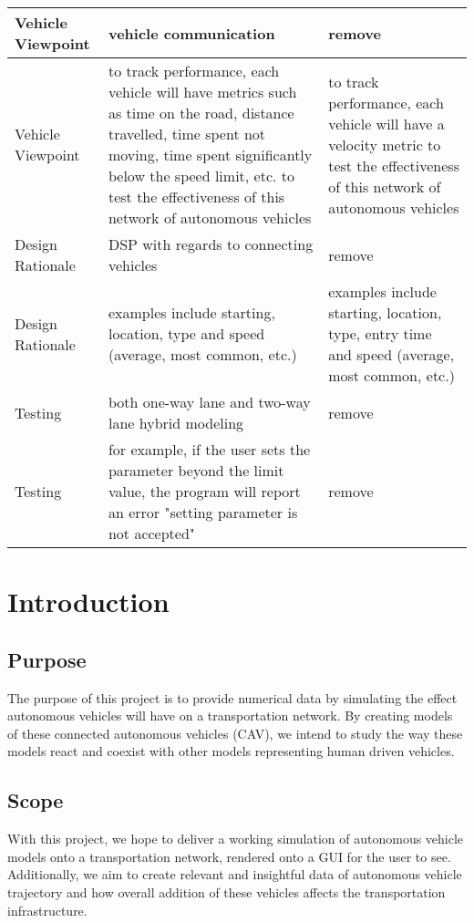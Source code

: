 \documentclass[onecolumn, draftclsnofoot,10pt, compsoc]{IEEEtran}
\begin{document}
\begin{table}[h]
\begin{tabular}{|p{1in}|p{2.5in}|p{2.5in}|}
Vehicle Viewpoint                               & vehicle communication & remove \\ \hline
Vehicle Viewpoint                               & to track performance, each vehicle will have metrics such as time on the road, distance travelled, time spent not moving, time spent significantly below the speed limit, etc. to test the effectiveness of this network of autonomous vehicles & to track performance, each vehicle will have a velocity metric to test the effectiveness of this network of autonomous vehicles \\ \hline
Design Rationale                                & DSP with regards to connecting vehicles & remove \\ \hline
Design Rationale                                & examples include starting, location, type and speed (average, most common, etc.) & examples include starting, location, type, entry time and speed (average, most common, etc.) \\ \hline
Testing                                         & both one-way lane and two-way lane hybrid modeling & remove \\ \hline
Testing                                         & for example, if the user sets the parameter beyond the limit value, the program will report an error "setting parameter is not accepted" & remove \\ \hline
\end{tabular}
\end{table}

\newpage

\section{Introduction}
\subsection{Purpose}
The purpose of this project is to provide numerical data by simulating the effect autonomous vehicles will have on a transportation network.
By creating models of these connected autonomous vehicles (CAV), we intend to study the way these models react and coexist with other models representing human driven vehicles.
\subsection{Scope}
With this project, we hope to deliver a working simulation of autonomous vehicle models onto a transportation network, rendered onto a GUI for the user to see.
Additionally, we aim to create relevant and insightful data of autonomous vehicle trajectory and how overall addition of these vehicles affects the transportation infrastructure.
\end{document}
